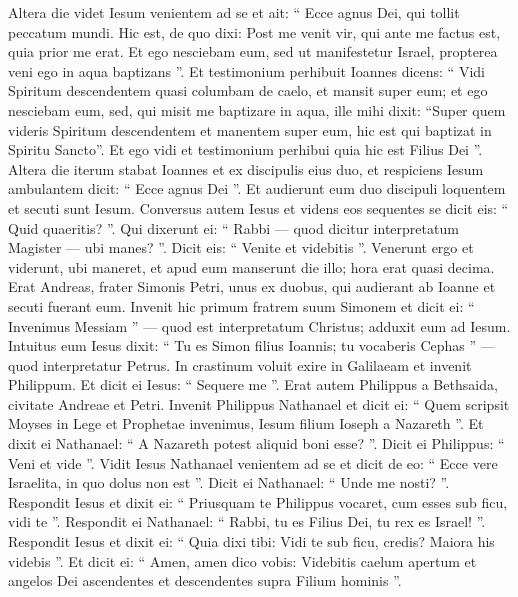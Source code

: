 \begin{biblechapter}
 \verse Altera die videt Iesum venientem ad se et ait: “ Ecce agnus Dei, qui tollit peccatum mundi. 
\verse Hic est, de quo dixi: Post me venit vir, qui ante me factus est, quia prior me erat. 
\verse Et ego nesciebam eum, sed ut manifestetur Israel, propterea veni ego in aqua baptizans ”. 
\verse Et testimonium perhibuit Ioannes dicens: “ Vidi Spiritum descendentem quasi columbam de caelo, et mansit super eum; 
\verse et ego nesciebam eum, sed, qui misit me baptizare in aqua, ille mihi dixit: “Super quem videris Spiritum descendentem et manentem super eum, hic est qui baptizat in Spiritu Sancto”. 
\verse Et ego vidi et testimonium perhibui quia hic est Filius Dei ”.
 \verse Altera die iterum stabat Ioannes et ex discipulis eius duo, 
\verse et respiciens Iesum ambulantem dicit: “ Ecce agnus Dei ”. 
\verse Et audierunt eum duo discipuli loquentem et secuti sunt Iesum. 
\verse Conversus autem Iesus et videns eos sequentes se dicit eis: “ Quid quaeritis? ”. Qui dixerunt ei: “ Rabbi — quod dicitur interpretatum Magister — ubi manes? ”. 
\verse Dicit eis: “ Venite et videbitis ”. Venerunt ergo et viderunt, ubi maneret, et apud eum manserunt die illo; hora erat quasi decima.
 \verse Erat Andreas, frater Simonis Petri, unus ex duobus, qui audierant ab Ioanne et secuti fuerant eum. 
\verse Invenit hic primum fratrem suum Simonem et dicit ei: “ Invenimus Messiam ” — quod est interpretatum Christus; 
\verse adduxit eum ad Iesum. Intuitus eum Iesus dixit: “ Tu es Simon filius Ioannis; tu vocaberis Cephas ” — quod interpretatur Petrus.
 \verse In crastinum voluit exire in Galilaeam et invenit Philippum. Et dicit ei Iesus: “ Sequere me ”. 
\verse Erat autem Philippus a Bethsaida, civitate Andreae et Petri. 
\verse Invenit Philippus Nathanael et dicit ei: “ Quem scripsit Moyses in Lege et Prophetae invenimus, Iesum filium Ioseph a Nazareth ”. 
\verse Et dixit ei Nathanael: “ A Nazareth potest aliquid boni esse? ”. Dicit ei Philippus: “ Veni et vide ”. 
\verse Vidit Iesus Nathanael venientem ad se et dicit de eo: “ Ecce vere Israelita, in quo dolus non est ”. 
\verse Dicit ei Nathanael: “ Unde me nosti? ”. Respondit Iesus et dixit ei: “ Priusquam te Philippus vocaret, cum esses sub ficu, vidi te ”. 
\verse Respondit ei Nathanael: “ Rabbi, tu es Filius Dei, tu rex es Israel! ”. 
\verse Respondit Iesus et dixit ei: “ Quia dixi tibi: Vidi te sub ficu, credis? Maiora his videbis ”. 
\verse Et dicit ei: “ Amen, amen dico vobis: Videbitis caelum apertum et angelos Dei ascendentes et descendentes supra Filium hominis ”.
 

\end{biblechapter}
